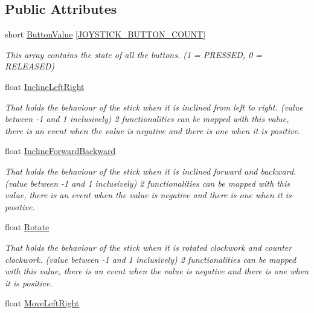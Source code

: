 \subsection*{Public Attributes}
\begin{DoxyCompactItemize}
\item 
short \hyperlink{struct_joystick_command_abe14f0b7b117048aa1c7f9626a669035}{Button\+Value} \mbox{[}\hyperlink{_kinova_types_8h_a3792c81f5808ad4f30000689ee0f0d07}{J\+O\+Y\+S\+T\+I\+C\+K\+\_\+\+B\+U\+T\+T\+O\+N\+\_\+\+C\+O\+U\+NT}\mbox{]}
\begin{DoxyCompactList}\small\item\em This array contains the state of all the buttons. (1 = P\+R\+E\+S\+S\+ED, 0 = R\+E\+L\+E\+A\+S\+ED) \end{DoxyCompactList}\item 
float \hyperlink{struct_joystick_command_a357b7ffd95720084658487aee12662c8}{Incline\+Left\+Right}
\begin{DoxyCompactList}\small\item\em That holds the behaviour of the stick when it is inclined from left to right. (value between -\/1 and 1 inclusively) 2 functionalities can be mapped with this value, there is an event when the value is negative and there is one when it is positive. \end{DoxyCompactList}\item 
float \hyperlink{struct_joystick_command_ac1ac2e83b68ea20eba3e92935b966ba6}{Incline\+Forward\+Backward}
\begin{DoxyCompactList}\small\item\em That holds the behaviour of the stick when it is inclined forward and backward. (value between -\/1 and 1 inclusively) 2 functionalities can be mapped with this value, there is an event when the value is negative and there is one when it is positive. \end{DoxyCompactList}\item 
float \hyperlink{struct_joystick_command_a02fece0bcf6cfc2135f294a3dbe9db4e}{Rotate}
\begin{DoxyCompactList}\small\item\em That holds the behaviour of the stick when it is rotated clockwork and counter clockwork. (value between -\/1 and 1 inclusively) 2 functionalities can be mapped with this value, there is an event when the value is negative and there is one when it is positive. \end{DoxyCompactList}\item 
float \hyperlink{struct_joystick_command_a6ca311d7940ce3c7ea6e9a3719388181}{Move\+Left\+Right}

\end{DoxyCompactItemize}
